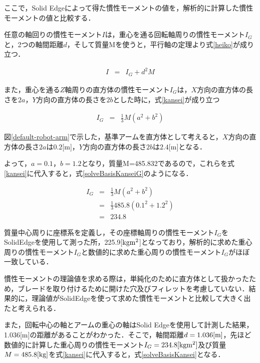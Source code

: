 ここで，Solid
Edgeによって得た慣性モーメントの値を，解析的に計算した慣性モーメントの値と比較する．

任意の軸回りの慣性モーメント\(I\)は，重心を通る回転軸周りの慣性モーメント\(I_G\)と，2つの軸間距離\(d\)，そして質量Mを使うと，平行軸の定理より式\ref{heiko}が成り立つ．

\begin{eqnarray}
  I &=& I_G+d^2M
  \label{heiko}
\end{eqnarray}

また，重心を通る\(Z\)軸周りの直方体の慣性モーメント\(I_G\)は，\(X\)方向の直方体の長さを\(2a\)，\(Y\)方向の直方体の長さを\(2b\)とした時に，式\ref{kansei}が成り立つ

\begin{eqnarray}
  I_G &=& \frac{1}{3}M(a^2+b^2)
  \label{kansei}
\end{eqnarray}

図\ref{default-robot-arm}で示した，基準アームを直方体として考えると，\(X\)方向の直方体の長さ\(2a\)は\(0.2\){[}m{]}，\(Y\)方向の直方体の長さ\(2b\)は\(2.4\){[}m{]}となる．

よって，\(a=0.1\)，\(b=1.2\)となり，質量M=485.832であるので，これらを式\ref{kansei}に代入すると，式\ref{solveBasisKanseiG}のようになる．

\begin{eqnarray}
  I_G &=& \frac{1}{3}M(a^2+b^2) \nonumber \\
&=& \frac{1}{3} 485.8(0.1^{2}+1.2^{2}) \nonumber \\
      &=& 234.8
  \label{solveBasisKanseiG}
\end{eqnarray}

質量中心周りに座標系を定義し，その座標軸周りの慣性モーメント\(I_G\)をSolidEdgeを使用して測った所，225.9{[}\(\rm kg m^2\){]}となっており，解析的に求めた重心周りの慣性モーメント\(I_G\)と数値的に求めた重心周りの慣性モーメント\(I_G\)がほぼ一致している．

慣性モーメントの理論値を求める際は，単純化のために直方体として扱かったため，ブレードを取り付けるために開けた穴及びフィレットを考慮していない．結果的に，理論値がSolidEdgeを使って求めた慣性モーメントと比較して大きく出たと考えられる．

また，回転中心の軸とアームの重心の軸はSolid
Edgeを使用して計測した結果，1.036{[}m{]}の距離があることがわかった．そこで，軸間距離\(d=1.036[\rm m]\)，先ほど数値的に計算した重心周りの慣性モーメント\(I_G=234.8[\rm kgm^2]\)及び質量\(M=485.8[\rm kg]\)を式\ref{kansei}に代入すると，式\ref{solveBasisKansei}となる．

